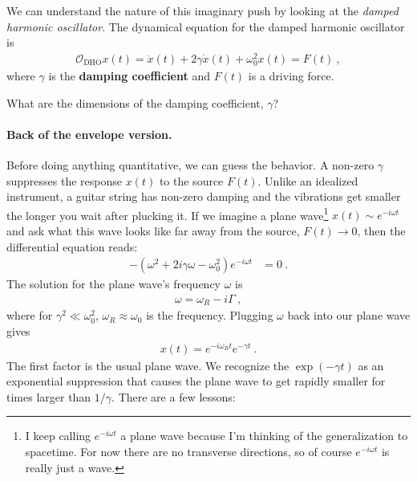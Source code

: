  We can understand the nature of this imaginary push by looking at the \emph{damped harmonic oscillator}. The dynamical equation for the damped harmonic oscillator is
 \begin{align}
 	\mathcal O_\text{DHO} x(t) = \ddot{x}(t) + 2\gamma\dot x(t) + \omega_0^2 x(t) = F(t) \ ,
 \end{align}
 where $\gamma$ is the \textbf{damping coefficient} and $F(t)$ is a driving force.
 \begin{exercise}
 What are the dimensions of the damping coefficient, $\gamma$?
 \end{exercise}
 
 \paragraph{Back of the envelope version.}
 Before doing anything quantitative, we can guess the behavior. A non-zero $\gamma$ suppresses the response $x(t)$ to the source $F(t)$. Unlike an idealized instrument, a guitar string has non-zero damping and the vibrations get smaller the longer you wait after plucking it. If we imagine a plane wave\footnote{I keep calling $e^{-i\omega t}$ a plane wave because I'm thinking of the generalization to spacetime. For now there are no transverse directions, so of course $e^{-i\omega t}$ is really just a wave.} $x(t)\sim e^{-i\omega t}$ and ask what this wave looks like far away from the source, $F(t)\to 0$, then the differential equation reads:
 \begin{align}
 	-\left(\omega^2 +2i\gamma \omega - \omega_0^2\right)e^{-i\omega t} &= 0 \ .
 \end{align}
 The solution for the plane wave's frequency $\omega$ is
 \begin{align}
 	\omega = \omega_R - i\Gamma \ , \label{eq:DHO:back:envelope:poles}
 \end{align}
 where for $\gamma^2 \ll \omega_0^2$, $\omega_R \approx \omega_0$ is the frequency.  Plugging $\omega$ back into our plane wave gives
 \begin{align}
 	x(t) = e^{-i\omega_R t}e^{-\gamma t} \ .
 \end{align}
 The first factor is the usual plane wave. We recognize the $\exp(-\gamma t)$ as an exponential suppression that causes the plane wave to get rapidly smaller for times larger than $1/\gamma$. There are a few lessons:
